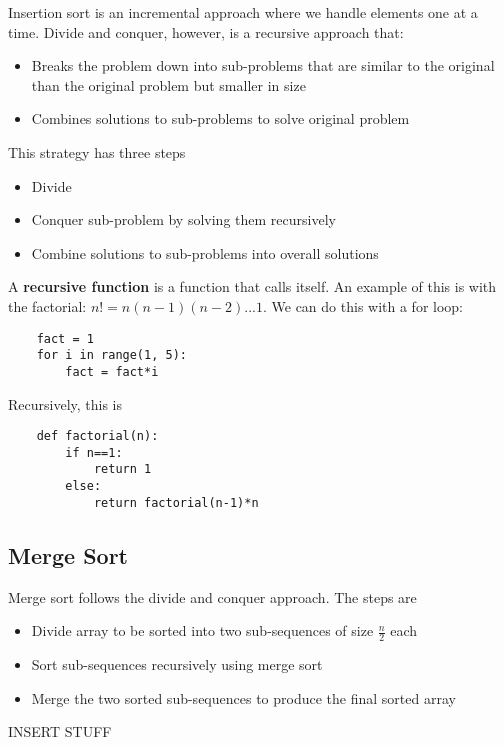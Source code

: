 \documentclass[]{article}
\begin{document}
Insertion sort is an incremental approach where we handle elements one at a time. Divide and conquer, however, is a recursive approach that: 
\begin{itemize}
	\item Breaks the problem down into sub-problems that are similar to the original than the original problem but smaller in size
	\item Combines solutions to sub-problems to solve original problem
\end{itemize} \bigbreak

This strategy has three steps
\begin{itemize}
	\item Divide
	\item Conquer sub-problem by solving them recursively
	\item Combine solutions to sub-problems into overall solutions
\end{itemize}\bigbreak

A \textbf{recursive function} is a function that calls itself. An example of this is with the factorial: $n! = n (n-1) (n-2) ... 1$. We can do this with a for loop:

\begin{lstlisting}
	fact = 1
	for i in range(1, 5):
		fact = fact*i
\end{lstlisting}\bigbreak
 
Recursively, this is

\begin{lstlisting}
	def factorial(n):
		if n==1:
			return 1
		else:
			return factorial(n-1)*n
\end{lstlisting}\bigbreak

\subsection{Merge Sort}\bigbreak

Merge sort follows the divide and conquer approach. The steps are

\begin{itemize}
	\item Divide array to be sorted into two sub-sequences of size $\frac{n}{2}$ each
	\item Sort sub-sequences recursively using merge sort
	\item Merge the two sorted sub-sequences to produce the final sorted array
\end{itemize}\bigbreak

INSERT STUFF
\end{document}
